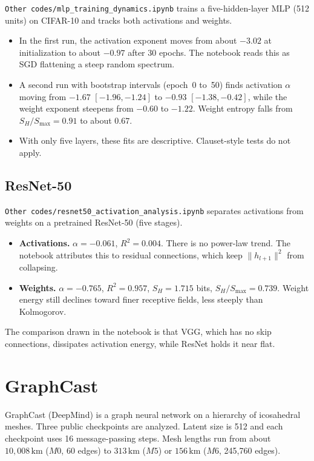 \documentclass[11pt,a4paper]{article}
\begin{document}
\texttt{Other codes/mlp\_training\_dynamics.ipynb} trains a five-hidden-layer MLP (512 units) on CIFAR-10 and tracks both activations and weights.
\begin{itemize}
  \item In the first run, the activation exponent moves from about \(-3.02\) at initialization to about \(-0.97\) after 30 epochs. The notebook reads this as SGD flattening a steep random spectrum.
  \item A second run with bootstrap intervals (epoch~0 to~50) finds activation \(\alpha\) moving from \(-1.67\) \([-1.96,-1.24]\) to \(-0.93\) \([-1.38,-0.42]\), while the weight exponent steepens from \(-0.60\) to \(-1.22\). Weight entropy falls from \(S_H/S_{\max} = 0.91\) to about \(0.67\).
  \item With only five layers, these fits are descriptive. Clauset-style tests do not apply.
\end{itemize}

\subsection{ResNet-50}

\texttt{Other codes/resnet50\_activation\_analysis.ipynb} separates activations from weights on a pretrained ResNet-50 (five stages).
\begin{itemize}
  \item \textbf{Activations.} \(\alpha = -0.061\), \(R^2 = 0.004\). There is no power-law trend. The notebook attributes this to residual connections, which keep \(\|h_{l+1}\|^2\) from collapsing.
  \item \textbf{Weights.} \(\alpha = -0.765\), \(R^2 = 0.957\), \(S_H = 1.715\) bits, \(S_H/S_{\max} = 0.739\). Weight energy still declines toward finer receptive fields, less steeply than Kolmogorov.
\end{itemize}
The comparison drawn in the notebook is that VGG, which has no skip connections, dissipates activation energy, while ResNet holds it near flat.

\section{GraphCast}
\label{sec:graphcast}

GraphCast (DeepMind) is a graph neural network on a hierarchy of icosahedral meshes.
Three public checkpoints are analyzed.
Latent size is 512 and each checkpoint uses 16 message-passing steps.
Mesh lengths run from about \(10{,}008\,\mathrm{km}\) (\(M0\), 60 edges) to \(313\,\mathrm{km}\) (\(M5\)) or \(156\,\mathrm{km}\) (\(M6\), 245{,}760 edges).
\end{document}
